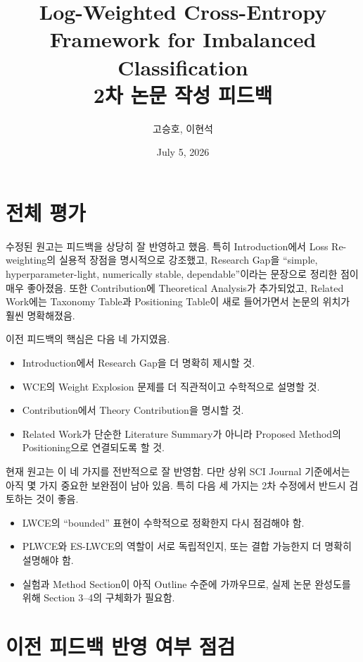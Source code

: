 \documentclass[11pt,a4paper]{article}
\title{\textbf{Log-Weighted Cross-Entropy Framework for Imbalanced Classification}\\
\vspace{5mm}
\large 2차 논문 작성 피드백}
\author{고승호, 이현석}
\date{July 5, 2026}
\begin{document}
\maketitle

\section{전체 평가}

수정된 원고는 피드백을 상당히 잘 반영하고 했음. 특히 Introduction에서 Loss Re-weighting의 실용적 장점을 명시적으로 강조했고, Research Gap을 ``simple, hyperparameter-light, numerically stable, dependable''이라는 문장으로 정리한 점이 매우 좋아졌음. 또한 Contribution에 Theoretical Analysis가 추가되었고, Related Work에는 Taxonomy Table과 Positioning Table이 새로 들어가면서 논문의 위치가 훨씬 명확해졌음.

이전 피드백의 핵심은 다음 네 가지였음.

\begin{itemize}
\item Introduction에서 Research Gap을 더 명확히 제시할 것.
\item WCE의 Weight Explosion 문제를 더 직관적이고 수학적으로 설명할 것.
\item Contribution에서 Theory Contribution을 명시할 것.
\item Related Work가 단순한 Literature Summary가 아니라 Proposed Method의 Positioning으로 연결되도록 할 것.
\end{itemize}

현재 원고는 이 네 가지를 전반적으로 잘 반영함. 다만 상위 SCI Journal 기준에서는 아직 몇 가지 중요한 보완점이 남아 있음. 특히 다음 세 가지는 2차 수정에서 반드시 검토하는 것이 좋음.

\begin{tcolorbox}[title=2차 수정의 핵심 방향]
\begin{itemize}
\item LWCE의 ``bounded'' 표현이 수학적으로 정확한지 다시 점검해야 함.
\item PLWCE와 ES-LWCE의 역할이 서로 독립적인지, 또는 결합 가능한지 더 명확히 설명해야 함.
\item 실험과 Method Section이 아직 Outline 수준에 가까우므로, 실제 논문 완성도를 위해 Section 3--4의 구체화가 필요함.
\end{itemize}
\end{tcolorbox}

\section{이전 피드백 반영 여부 점검}
\end{document}
